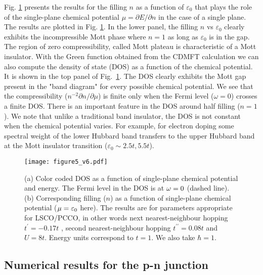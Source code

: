 \documentclass[twocolumn, preprintnumbers,prb,aps,amssymb,showpacs]{revtex4}
\begin{document}
Fig. \ref{fig1:DOS_mu} presents the results for the filling $n$ as a function of $\varepsilon_0$ that plays the role of the single-plane chemical potential $\mu=\partial E/\partial n$ in the case of a single plane. The results are plotted in Fig. \ref{fig1:DOS_mu}. In the
lower panel, the filling $n$ vs $\varepsilon_0$ clearly exhibits
the incompressible Mott phase where $n=1$ as long as $\varepsilon_0$ is in the gap.
The region of zero compressibility, called Mott plateau is
characteristic of a Mott insulator. With the Green function obtained from
the CDMFT calculation we can also compute the density of state (DOS) as a
function of the chemical potential.
It is shown in the top panel of Fig.~\ref{fig1:DOS_mu}. The DOS clearly exhibits the Mott gap present in the "band diagram" for every possible chemical potential. We see that the compressibility ($n^{-2}\partial n/ \partial \mu$) is finite only when the Fermi level ($\omega=0$) crosses a finite DOS. There is an important feature in the DOS around half filling ($n=1$). We note that unlike a traditional band insulator, the DOS is not constant when the chemical potential varies. For example, for electron doping some spectral weight of the lower Hubbard band transfers to the upper Hubbard band at the Mott insulator transition ($\varepsilon_0\sim2.5t,5.5t$).

\begin{figure}[tbp]
\par
\begin{center}
\texttt{[image: figure5\_v6.pdf]}
\end{center}
\caption{(a) Color coded DOS as a function of single-plane chemical potential and
energy. The Fermi level in the DOS is at $\protect\omega=0$ (dashed line).
(b) Corresponding filling ($n$) as a function of single-plane chemical potential
($\protect\mu=\varepsilon_0$ here). The results are for parameters appropriate for LSCO/PCCO, in other words next nearest-neighbour hopping $t^{\prime}=-0.17t$ \cite{pavarini_band-structure_2001}, second nearest-neighbour hopping $t^{\prime\prime}=0.08t$ and $U=8t$. Energy units correspond to $t=1$. We also take $\hbar = 1$.}
\label{fig1:DOS_mu}
\end{figure}

\subsection{Numerical results for the p-n junction}
\end{document}
